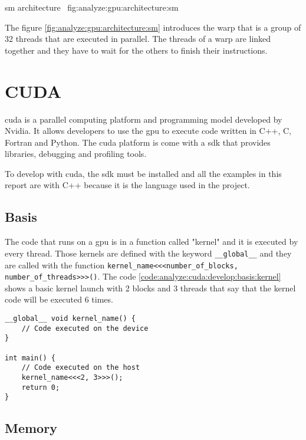 {\acrshort{sm} architecture~\cite{nvidia-a100-architecture}}
{fig:analyze:gpu:architecture:sm}

The figure \ref{fig:analyze:gpu:architecture:sm} introduces the warp that is a
group of 32 threads that are executed in parallel.
The threads of a warp are linked together and they have to wait for the others
to finish their instructions.


\section{CUDA}
\label{ch:analyze:cuda}

\acrfull{cuda} is a parallel computing platform and programming model developed
by Nvidia.
It allows developers to use the \acrshort{gpu} to execute code written in C++, C, Fortran
and Python.
The \acrshort{cuda} platform is come with a \acrshort{sdk} that provides
libraries, debugging and profiling tools.

To develop with \acrshort{cuda}, the \acrshort{sdk} must be installed and all
the examples in this report are with C++ because it is the language used in the
project.

\subsection{Basis}
\label{ch:analyze:cuda:basis}

The code that runs on a \acrshort{gpu} is in a function called "kernel" and it
is executed by every thread.
Those kernels are defined with the keyword \texttt{\_\_global\_\_} and they are called
with the function \texttt{kernel\_name<<<number\_of\_blocks, number\_of\_threads>>>()}.
The code \ref{code:analyze:cuda:develop:basis:kernel} shows a basic kernel
launch with 2 blocks and 3 threads that say that the kernel code will be
executed 6 times.

\begin{code}
    \label{code:analyze:cuda:basis:kernel}
    \begin{verbatim}
__global__ void kernel_name() {
    // Code executed on the device
}

int main() {
    // Code executed on the host
    kernel_name<<<2, 3>>>();
    return 0;
}
    \end{verbatim}
\end{code}

\subsection{Memory}
\label{ch:analyze:cuda:memory}

